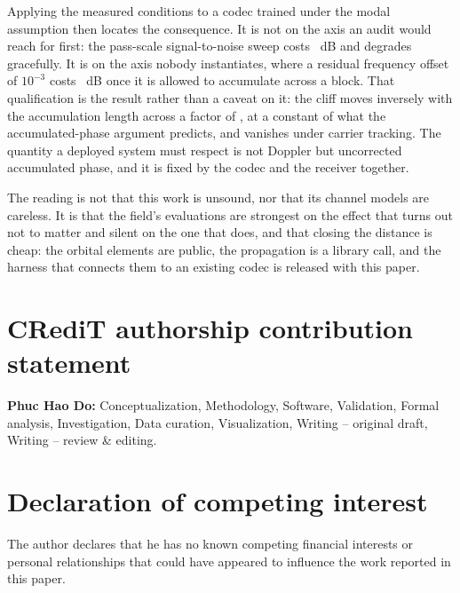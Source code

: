 \documentclass[preprint,11pt,3p]{elsarticle}
\begin{document}
Applying the measured conditions to a codec trained under the modal assumption then locates the
consequence. It is not on the axis an audit would reach for first: the pass-scale
signal-to-noise sweep costs \numPsnrDrop~dB and degrades gracefully. It is on the axis nobody instantiates, where a residual frequency offset of $10^{-3}$ costs
\numDropCfoEb~dB once it is allowed to accumulate across a block. That qualification is the
result rather than a caveat on it: the cliff moves inversely with the accumulation length across
a factor of \numLspan{}, at a constant \numCliffRatio{} of what the accumulated-phase argument
predicts, and vanishes under carrier tracking. The quantity a deployed system must respect is not
Doppler but uncorrected accumulated phase, and it is fixed by the codec and the receiver
together.

The reading is not that this work is unsound, nor that its channel models are careless. It is
that the field's evaluations are strongest on the effect that turns out not to matter and silent
on the one that does, and that closing the distance is cheap: the orbital elements are public,
the propagation is a library call, and the harness that connects them to an existing codec is
released with this paper.

\section*{CRediT authorship contribution statement}

\textbf{Phuc Hao Do:} Conceptualization, Methodology, Software, Validation, Formal analysis,
Investigation, Data curation, Visualization, Writing -- original draft, Writing -- review \&
editing.

\section*{Declaration of competing interest}

The author declares that he has no known competing financial interests or personal relationships
that could have appeared to influence the work reported in this paper.
\end{document}
